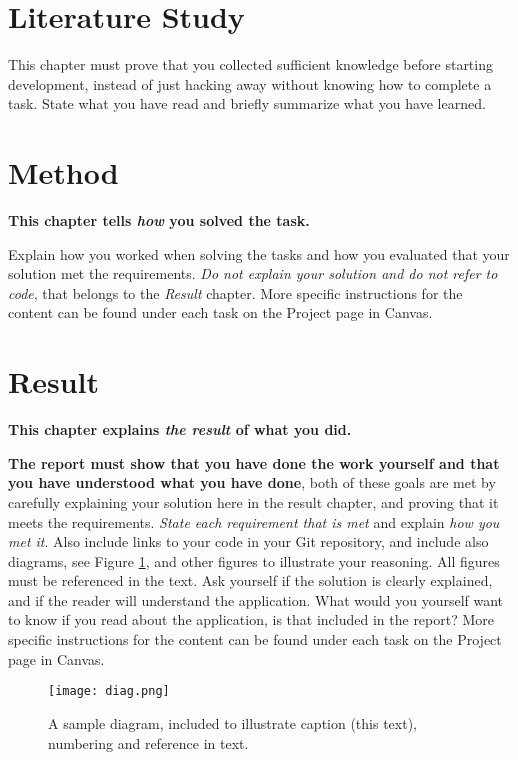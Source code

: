 \documentclass[a4paper]{scrartcl}
\begin{document}
\section{Literature Study}

This chapter must prove that you collected sufficient knowledge before starting development, instead of just hacking away without knowing how to complete a task. State what you have read and briefly summarize what you have learned.

\section{Method}

\textbf{This chapter tells \textit{how} you solved the task.}

Explain how you worked when solving the tasks and how you evaluated that your solution met the requirements. \textit{Do not explain your solution and do not refer to code}, that belongs to the \textit{Result} chapter. More specific instructions for the content can be found under each task on the Project page in Canvas.

\section{Result}

\textbf{This chapter explains \textit{the result} of what you did.}

\textbf{The report must show that you have done the work yourself and that you have understood what you have done}, both of these goals are met by carefully explaining your solution here in the result chapter, and proving that it meets the requirements. \textit{State each requirement that is met} and explain \textit{how you met it}. Also include links to your code in your Git repository, and include also diagrams, see Figure \ref{fig:diag}, and other figures to illustrate your reasoning. All figures must be referenced in the text. Ask yourself if the solution is clearly explained, and if the reader will understand the application. What would you yourself want to know if you read about the application, is that included in the report? More specific instructions for the content can be found under each task on the Project page in Canvas. 

\begin{figure}[h!]
  \begin{center}
    \texttt{[image: diag.png]}
    \caption{A sample diagram, included to illustrate caption (this text), numbering and reference in text.}
    \label{fig:diag}
  \end{center}
\end{figure}
\end{document}
